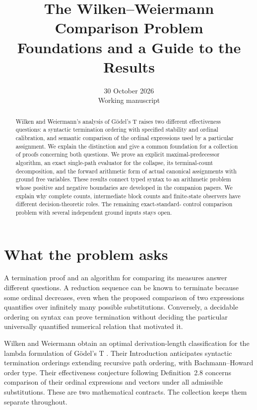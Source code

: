 \documentclass[11pt,a4paper]{article}
\title{The Wilken--Weiermann Comparison Problem\\
Foundations and a Guide to the Results}
\author{}
\date{30 October 2026\\Working manuscript}
\begin{document}
\maketitle
\begin{abstract}
Wilken and Weiermann's analysis of G\"odel's T raises two different
effectiveness questions: a syntactic termination ordering with specified
stability and ordinal calibration, and semantic comparison of the ordinal
expressions used by a particular assignment.  We explain the distinction
and give a common foundation for a collection of proofs concerning both
questions.  We prove an explicit maximal-predecessor algorithm, an exact
single-path evaluator for the collapse, its terminal-count decomposition,
and the forward arithmetic form of actual canonical assignments with ground
free variables.  These results connect typed syntax to an arithmetic problem
whose positive and negative boundaries are developed in the companion papers.
We explain why complete counts, intermediate block counts and finite-state
observers have different decision-theoretic roles.  The remaining exact-standard-
control comparison problem with several independent ground inputs stays open.
\end{abstract}

\tableofcontents

\section{What the problem asks}\label{sec:problem}

A termination proof and an algorithm for comparing its measures answer
different questions.  A reduction sequence can be known to terminate because
some ordinal decreases, even when the proposed comparison of two expressions
quantifies over infinitely many possible substitutions.  Conversely, a
decidable ordering on syntax can prove termination without deciding the
particular universally quantified numerical relation that motivated it.

Wilken and Weiermann obtain an optimal derivation-length classification for
the lambda formulation of G\"odel's T \cite{ww}.  Their Introduction
anticipates syntactic termination orderings extending recursive path ordering,
with Bachmann--Howard order type.  Their effectiveness conjecture following
Definition~2.8 concerns comparison of their ordinal expressions and vectors
under all admissible substitutions.  These are two mathematical contracts.
The collection keeps them separate throughout.
\end{document}
